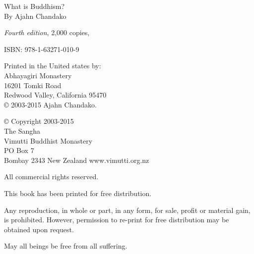 What is Buddhism?\\
By Ajahn Chandako

\textit{Fourth edition}, 2,000 copies, \the\year

ISBN: 978-1-63271-010-9

Printed in the United states by:\\
Abhayagiri Monastery\\
16201 Tomki Road\\
Redwood Valley, California 95470\\

© 2003-2015 Ajahn Chandako. 

© Copyright 2003-2015\\
The Sangha\\
Vimutti Buddhist Monastery\\
PO Box 7\\
Bombay 2343 New Zealand
www.vimutti.org.nz

All commercial rights reserved.

This book has been printed for free distribution.

Any reproduction, in whole or part, in any form, for sale, profit or material
gain, is prohibited. However, permission to re-print for free distribution may
be obtained upon request.

May all beings be free from all suffering.
